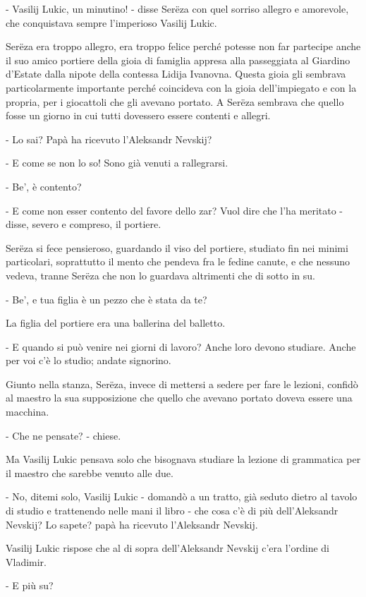 - Vasilij Lukic, un minutino! - disse Serëza con quel sorriso allegro e amorevole, che conquistava sempre l'imperioso Vasilij Lukic. 

Serëza era troppo allegro, era troppo felice perché potesse non far partecipe anche il suo amico portiere della gioia di famiglia appresa alla passeggiata al Giardino d'Estate dalla nipote della contessa Lidija Ivanovna. Questa gioia gli sembrava particolarmente importante perché coincideva con la gioia dell'impiegato e con la propria, per i giocattoli che gli avevano portato. A Serëza sembrava che quello fosse un giorno in cui tutti dovessero essere contenti e allegri. 

- Lo sai? Papà ha ricevuto l'Aleksandr Nevskij? 

- E come se non lo so! Sono già venuti a rallegrarsi. 

- Be', è contento? 

- E come non esser contento del favore dello zar? Vuol dire che l'ha meritato - disse, severo e compreso, il portiere. 

Serëza si fece pensieroso, guardando il viso del portiere, studiato fin nei minimi particolari, soprattutto il mento che pendeva fra le fedine canute, e che nessuno vedeva, tranne Serëza che non lo guardava altrimenti che di sotto in su. 

- Be', e tua figlia è un pezzo che è stata da te? 

La figlia del portiere era una ballerina del balletto. 

- E quando si può venire nei giorni di lavoro? Anche loro devono studiare. Anche per voi c'è lo studio; andate signorino. 

Giunto nella stanza, Serëza, invece di mettersi a sedere per fare le lezioni, confidò al maestro la sua supposizione che quello che avevano portato doveva essere una macchina. 

- Che ne pensate? - chiese. 

Ma Vasilij Lukic pensava solo che bisognava studiare la lezione di grammatica per il maestro che sarebbe venuto alle due. 

- No, ditemi solo, Vasilij Lukic - domandò a un tratto, già seduto dietro al tavolo di studio e trattenendo nelle mani il libro - che cosa c'è di più dell'Aleksandr Nevskij? Lo sapete? papà ha ricevuto l'Aleksandr Nevskij. 

Vasilij Lukic rispose che al di sopra dell'Aleksandr Nevskij c'era l'ordine di Vladimir. 

- E più su? 

